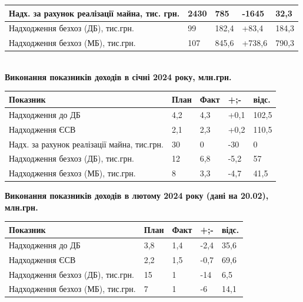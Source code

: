 \documentclass[a4paper,14pt]{article}
\begin{document}
\begin{center}
\begin{tabular}{||p{6cm}||p{2cm}||p{2cm}||p{2cm}||p{2cm}||}
		\hline
		Надх. за рахунок реалізації майна, тис. грн. & 2430 & 785 &  -1645 & 32,3\\ 
		\hline
		Надходження безхоз (ДБ), тис.грн.& 99  & 182,4 & +83,4 & 184,3\\ 
		\hline
		Надходження безхоз (МБ), тис.грн.& 107 & 845,6 & +738,6 & 790,3\\ 
		\hline \hline
		
	\end{tabular} \\
\bigskip
\bigskip
\bigskip
\bigskip
\textbf{Виконання показників доходів в січні 2024 року, млн.грн. }

\begin{tabular}{||p{6cm}||p{2cm}||p{2cm}||p{2cm}||p{2cm}||}
	\hline 	\hline  
	Показник & План & Факт & +;- & відс. \\ 
	\hline \hline 
	Надходження до ДБ & 4,2 & 4,3 & +0,1 & 102,5 \\ 
	\hline 
	Надходження ЄСВ & 2,1 & 2,3 & +0,2 & 110,5\\ 
	
	\hline 
	Надх. за рахунок реалізації майна, тис.грн. & 30 & 0& -30 & 0\\ 
	\hline
	Надходження безхоз (ДБ), тис.грн.& 12 & 6,8 & -5,2 & 57\\ 
	\hline
	Надходження безхоз (МБ), тис.грн.& 8 & 3,3 & -4,7 & 41,5\\ 
	\hline \hline
	
\end{tabular} 

\textbf{Виконання показників доходів в лютому 2024 року (дані на 20.02), млн.грн. }

\begin{tabular}{||p{6cm}||p{2cm}||p{2cm}||p{2cm}||p{2cm}||}
	\hline 	\hline  
	Показник & План & Факт & +;- & відс. \\ 
	\hline \hline 
	Надходження до ДБ & 3,8 & 1,4 & -2,4 & 35,6 \\ 
	\hline 
	Надходження ЄСВ & 2,2 & 1,5 & -0,7 & 69,6\\ 	
	\hline
	Надходження безхоз (ДБ), тис.грн.& 15 & 1 & -14 & 6,5\\ 
	\hline
	Надходження безхоз (МБ), тис.грн.& 7 & 1 & -6 & 14,1\\ 
	\hline \hline
	
\end{tabular} 
\end{center}


	
	
	
\end{document}
